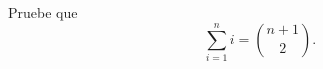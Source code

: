 \begin{statement}{13}
  Pruebe que
  \[
    \sum_{i = 1}^n i = \binom{n + 1}{2}.
  \]
\end{statement}